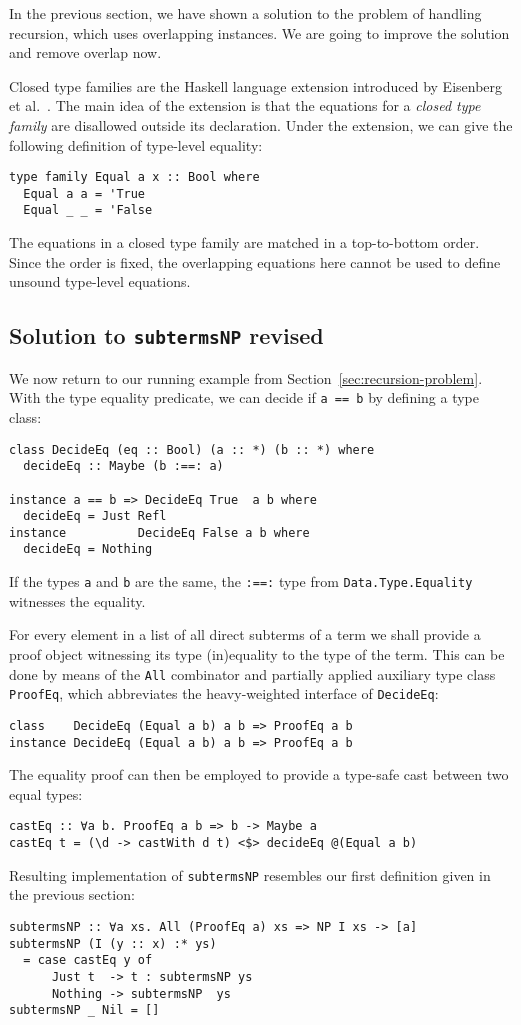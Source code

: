 \documentclass[runningheads]{llncs}
\newcommand{\K}[1]{\lstinline{#1}}
\begin{document}
In the previous section, we have shown a solution to the problem of handling recursion, which uses overlapping instances. We are going to improve the solution and remove overlap now.

Closed type families are the Haskell language extension introduced by Eisenberg et al.~\cite{Eisenberg2014}. The main idea of the extension is that the equations for a \emph{closed type family} are disallowed outside its declaration. Under the extension, we can give the following definition of type-level equality:
\begin{lstlisting}
type family Equal a x :: Bool where
  Equal a a = 'True
  Equal _ _ = 'False
\end{lstlisting}
The equations in a closed type family are matched in a top-to-bottom order. Since the order is fixed, the overlapping equations here cannot be used to define unsound type-level equations.

\subsection{Solution to \K{subtermsNP} revised}
\label{subsec:solve-subtermnp}

We now return to our running example from Section~\ref{sec:recursion-problem}. With the type equality predicate, we can decide if \K{a == b} by defining a type class:
\begin{lstlisting}
class DecideEq (eq :: Bool) (a :: *) (b :: *) where
  decideEq :: Maybe (b :==: a)

instance a == b => DecideEq True  a b where
  decideEq = Just Refl
instance          DecideEq False a b where
  decideEq = Nothing
\end{lstlisting}
If the types \K{a} and \K{b} are the same, the \K{:==:} type from \K{Data.Type.Equality} witnesses the equality.

For every element in a list of all direct subterms of a term we shall provide a proof object witnessing its type (in)equality to the type of the term. This can be done by means of the \K{All} combinator and partially applied auxiliary type class \K{ProofEq}, which abbreviates the heavy-weighted interface of \K{DecideEq}:
\begin{lstlisting}
class    DecideEq (Equal a b) a b => ProofEq a b
instance DecideEq (Equal a b) a b => ProofEq a b
\end{lstlisting}
The equality proof can then be employed to provide a type-safe cast between two equal types:
\begin{lstlisting}
castEq :: ∀a b. ProofEq a b => b -> Maybe a
castEq t = (\d -> castWith d t) <$> decideEq @(Equal a b)
\end{lstlisting}
Resulting implementation of \K{subtermsNP} resembles our first definition given in the previous section:
\begin{lstlisting}
subtermsNP :: ∀a xs. All (ProofEq a) xs => NP I xs -> [a]
subtermsNP (I (y :: x) :* ys)
  = case castEq y of
      Just t  -> t : subtermsNP ys
      Nothing -> subtermsNP  ys
subtermsNP _ Nil = []
\end{lstlisting}
\end{document}
